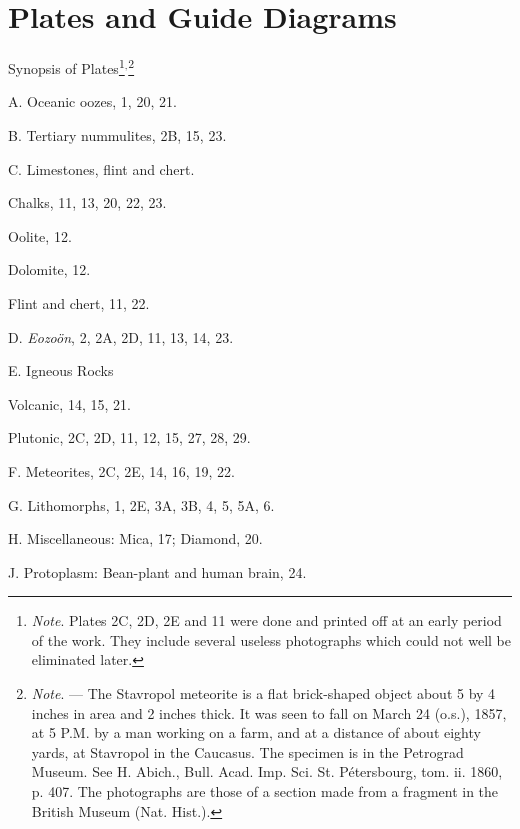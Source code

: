 \documentclass[a4paper, 12pt, oneside]{article}
\begin{document}
\section{Plates and Guide Diagrams}
\centerline{Synopsis of Plates\footnote{\emph{Note}. Plates 2C, 2D, 2E and 11 were done and printed off at an early period of the work. They include several useless photographs which could not well be eliminated later.}$^{,}$\footnote{\emph{Note}. --- The Stavropol meteorite is a flat brick-shaped object about 5 by 4 inches in area and 2 inches thick. It was seen to fall on March 24 (o.s.), 1857, at 5 P.M. by a man working on a farm, and at a distance of about eighty yards, at Stavropol in the Caucasus. The specimen is in the Petrograd Museum. See H. Abich., Bull. Acad. Imp. Sci. St. Pétersbourg, tom. ii. 1860, p. 407. The photographs are those of a section made from a fragment in the British Museum (Nat. Hist.).}}
\bigskip
\begin{description}
    \item A. Oceanic oozes, 1, 20, 21.
    \item B. Tertiary nummulites, 2B, 15, 23.
    \item C. Limestones, flint and chert.
    \item\hspace{15mm}Chalks, 11, 13, 20, 22, 23.
    \item\hspace{15mm}Oolite, 12.
    \item\hspace{15mm}Dolomite, 12.
    \item\hspace{15mm}Flint and chert, 11, 22.
    \item D. \emph{Eozoön}, 2, 2A, 2D, 11, 13, 14, 23.
    \item E. Igneous Rocks
    \item\hspace{15mm}Volcanic, 14, 15, 21.
    \item\hspace{15mm}Plutonic, 2C, 2D, 11, 12, 15, 27, 28, 29.
    \item F. Meteorites, 2C, 2E, 14, 16, 19, 22.
    \item G. Lithomorphs, 1, 2E, 3A, 3B, 4, 5, 5A, 6.
    \item H. Miscellaneous: Mica, 17; Diamond, 20.
    \item J. Protoplasm: Bean-plant and human brain, 24.
\end{description}
\end{document}
